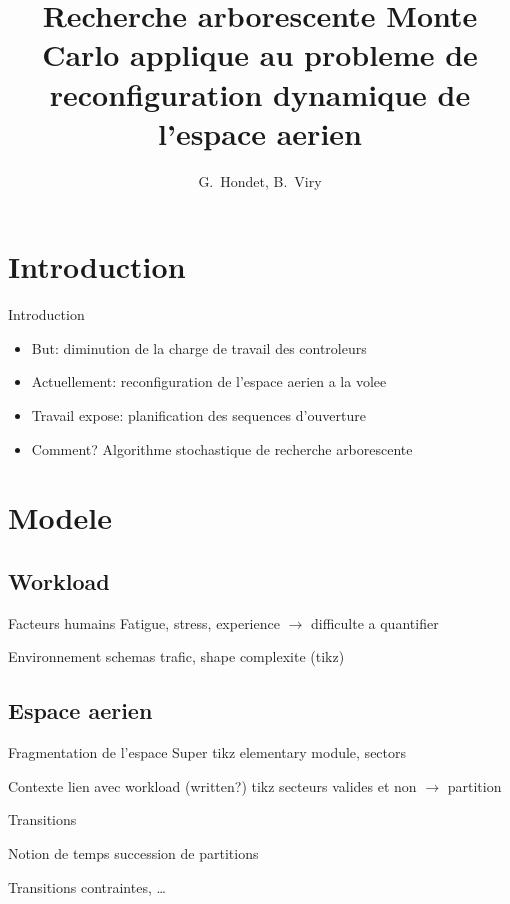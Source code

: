 \documentclass[tikz]{beamer}
\title[Reconfiguration par Monte Carlo]{%
  Recherche arborescente Monte Carlo applique au probleme de reconfiguration
  dynamique de l'espace aerien
}
\author[Hondet, Viry]{G.~Hondet, B.~Viry}
\begin{document}
\begin{frame}
  \titlepage{}
\end{frame}


\section*{Introduction}

\begin{frame}[c]{Introduction}
  \begin{itemize}
    \item But: diminution de la charge de travail des controleurs
    \item Actuellement: reconfiguration de l'espace aerien a la volee
    \item Travail expose: planification des sequences d'ouverture
    \item Comment? Algorithme stochastique de recherche arborescente
  \end{itemize}
\end{frame}

\section{Modele}
\subsection{Workload}
\begin{frame}
  
  \begin{block}{Facteurs humains}
    Fatigue, stress, experience \(\longrightarrow\) difficulte a quantifier
  \end{block}
  \begin{block}{Environnement}
    schemas trafic, shape complexite (tikz)
  \end{block}
\end{frame}


\subsection{Espace aerien}
\begin{frame}{Fragmentation de l'espace}
  Super tikz elementary module, sectors
\end{frame}
\begin{frame}{Contexte}
  lien avec workload (written?)
  tikz secteurs valides et non \(\rightarrow\) partition
\end{frame}
\begin{frame}
  {Transitions}
  \begin{block}{Notion de temps}
    succession de partitions
  \end{block}
  \begin{block}{Transitions}
    contraintes, \dots
  \end{block}
\end{frame}
\end{document}
